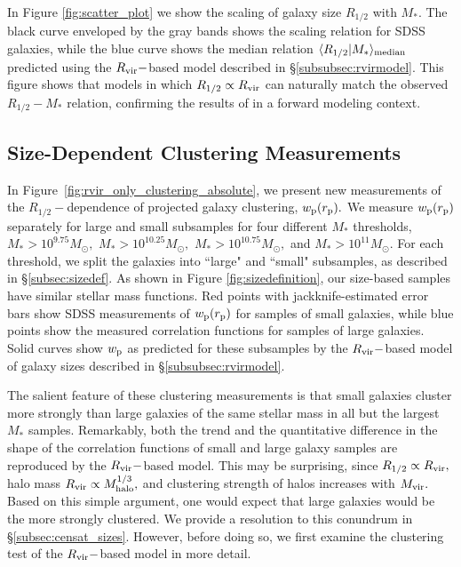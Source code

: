 \documentclass[usenatbib,usegraphicx,letterpaper]{mn2e}
\newcommand{\rhalf}{R_{1/2}}
\newcommand{\mstar}{M_{\ast}}
\newcommand{\mvir}{M_{\rm vir}}
\newcommand{\mhalo}{M_{\rm halo}}
\newcommand{\rvir}{R_{\rm vir}}
\newcommand{\rproj}{r_{\rm p}}
\newcommand{\wproj}{w_{\rm p}}
\newcommand{\median}[2]{\langle{#1}\vert{#2}\rangle_{\rm median}}
\newcommand{\msun}{M_\odot}
\begin{document}
In Figure \ref{fig:scatter_plot} we show the scaling of galaxy size $\rhalf$ with $\mstar.$ The black curve enveloped by the gray bands shows the scaling relation for SDSS galaxies, while the blue curve shows the median relation  $\median{\rhalf}{\mstar}$ predicted using the $\rvir-$based model described in \S\ref{subsubsec:rvirmodel}. This figure shows that models in which $\rhalf\propto\rvir$ can naturally match the observed $\rhalf-\mstar$ relation, confirming the results of \citet{kravtsov13} in a forward modeling context.

\subsection{Size-Dependent Clustering Measurements}
\label{subsec:clustering_results}

In Figure~\ref{fig:rvir_only_clustering_absolute}, we present new measurements of the $\rhalf-$dependence of projected galaxy clustering, $\wproj(\rproj).$ We measure $\wproj(\rproj)$ separately for large and small subsamples for four different $\mstar$ thresholds, $\mstar>10^{9.75}\msun,$ $\mstar>10^{10.25}\msun,$ $\mstar>10^{10.75}\msun,$ and $\mstar>10^{11}\msun.$ For each threshold, we split the galaxies into ``large" and ``small" subsamples, as described in \S\ref{subsec:sizedef}. As shown in Figure \ref{fig:sizedefinition}, our size-based samples  have similar stellar mass functions. Red points with jackknife-estimated error bars show SDSS measurements of $\wproj(\rproj)$ for samples of small galaxies, while blue points show the measured correlation functions for samples of large galaxies. Solid curves show $\wproj$ as predicted for these subsamples by the $\rvir-$based model of galaxy sizes described in \S\ref{subsubsec:rvirmodel}.

The salient feature of these clustering measurements is that small galaxies cluster more strongly than large galaxies of the same stellar mass in all but the largest $\mstar$ samples. Remarkably, both the trend and the quantitative difference in the shape of the correlation functions of small and large galaxy samples are reproduced by the $\rvir-$based model. This may be surprising, since $\rhalf\propto\rvir,$ halo mass $\rvir\propto\mhalo^{1/3},$ and clustering strength of halos increases with $\mvir.$ Based on this simple argument, one would expect that large galaxies would be the more strongly clustered. We provide a resolution to this conundrum in \S\ref{subsec:censat_sizes}. However,  before doing so, we first examine the clustering test of the $\rvir-$based model in more detail.
\end{document}
